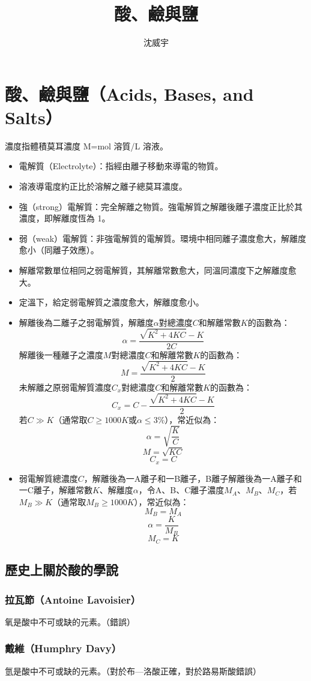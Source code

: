 \documentclass[a4paper,12pt]{article}
\begin{document}
\title{酸、鹼與鹽}
\author{沈威宇}
\date{\temtoday}
\titletocdoc
\section{酸、鹼與鹽（Acids, Bases, and Salts）}
濃度指體積莫耳濃度 M=mol 溶質/L 溶液。
\begin{itemize}
\item 電解質（Electrolyte）：指經由離子移動來導電的物質。
\item 溶液導電度約正比於溶解之離子總莫耳濃度。
\item 強（strong）電解質：完全解離之物質。強電解質之解離後離子濃度正比於其濃度，即解離度恆為 1。
\item 弱（weak）電解質：非強電解質的電解質。環境中相同離子濃度愈大，解離度愈小（同離子效應）。
\item 解離常數單位相同之弱電解質，其解離常數愈大，同溫同濃度下之解離度愈大。
\item 定溫下，給定弱電解質之濃度愈大，解離度愈小。
\item 解離後為二離子之弱電解質，解離度$\alpha$對總濃度$C$和解離常數$K$的函數為：
\[\alpha = \frac{\sqrt{K^2+4KC}-K}{2C}\]
解離後一種離子之濃度$M$對總濃度$C$和解離常數$K$的函數為：
\[M = \frac{\sqrt{K^2+4KC}-K}{2}\]
未解離之原弱電解質濃度$C_x$對總濃度$C$和解離常數$K$的函數為：
\[C_x = C-\frac{\sqrt{K^2+4KC}-K}{2}\]
若$C\gg K$（通常取$C\geq 1000 K$或$\alpha\leq 3\%$），常近似為：
\[\alpha=\sqrt{\frac{K}{C}}\]
\[M=\sqrt{KC}\]
\[C_x=C\]
\item 弱電解質總濃度$C$，解離後為一A離子和一B離子，B離子解離後為一A離子和一C離子，解離常數$K$、解離度$\alpha$，令A、B、C離子濃度$M_A$、$M_B$、$M_C$，若$M_B\gg K$（通常取$M_B\geq 1000 K$），常近似為：
\[M_B=M_A\]
\[\alpha=\frac{K}{M_B}\]
\[M_C=K\]
\end{itemize}
\subsection{歷史上關於酸的學說}
\subsubsection{拉瓦節（Antoine Lavoisier）}
氧是酸中不可或缺的元素。（錯誤）
\subsubsection{戴維（Humphry Davy）}
氫是酸中不可或缺的元素。（對於布—洛酸正確，對於路易斯酸錯誤）
\end{document}
